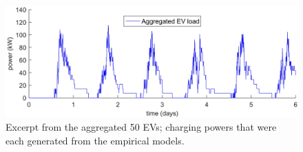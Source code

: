 \begin{figure}[htb]\centering
 \includegraphics{_chapter1/fig/input/aggregated-ev-power}
 \caption{Excerpt from the aggregated 50 EVs; charging powers that were each generated from the empirical models.}
 \label{ch1:fig:aggregated-ev-power}
\end{figure}
